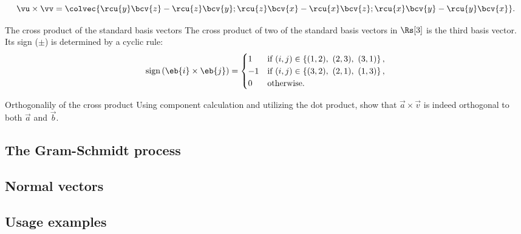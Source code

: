 \begin{equation}
  \vu\times\vv = \colvec{\rcu{y}\bcv{z}-\rcu{z}\bcv{y};\rcu{z}\bcv{x}-\rcu{x}\bcv{z};\rcu{x}\bcv{y}-\rcu{y}\bcv{x}}.
	\label{eq:cross product calculation}
\end{equation}

\begin{note}{The cross product of the standard basis vectors}{}
	The cross product of two of the standard basis vectors in $\Rs[3]$ is the third basis vector. Its sign ($\pm$) is determined by a cyclic rule:
	\begin{equation*}
		\text{sign}\left( \eb{i}\times\eb{j} \right) =
		\begin{cases}
			1 & \text{if } (i,j)\in \left\{(1,2),\ (2,3),\ (3,1)\right\},\\
			-1 & \text{if } (i,j)\in \left\{(3,2),\ (2,1),\ (1,3)\right\},\\
			0 & \text{otherwise}.
		\end{cases}
	\end{equation*}
\end{note}
\begin{challenge}{Orthogonalily of the cross product}{}
	Using component calculation and utilizing the dot product, show that $\vec{a}\times\vec{v}$ is indeed orthogonal to both $\vec{a}$ and $\vec{b}$.
\end{challenge}
\subsection{The Gram-Schmidt process}
\subsection{Normal vectors}
\subsection{Usage examples}
